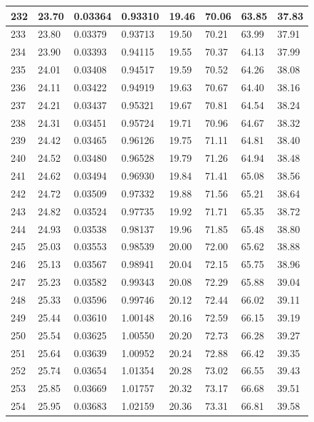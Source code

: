 \documentclass[12pt,a4paper,twoside]{article}
\begin{document}
\begin{center}
\begin{longtable}{l l l l | l l l l}
232 & 23.70 & 0.03364 & 0.93310 & 19.46 & 70.06 & 63.85 & 37.83 \\ \hline
233 & 23.80 & 0.03379 & 0.93713 & 19.50 & 70.21 & 63.99 & 37.91 \\ \hline
234 & 23.90 & 0.03393 & 0.94115 & 19.55 & 70.37 & 64.13 & 37.99 \\ \hline
235 & 24.01 & 0.03408 & 0.94517 & 19.59 & 70.52 & 64.26 & 38.08 \\ \hline
236 & 24.11 & 0.03422 & 0.94919 & 19.63 & 70.67 & 64.40 & 38.16 \\ \hline
237 & 24.21 & 0.03437 & 0.95321 & 19.67 & 70.81 & 64.54 & 38.24 \\ \hline
238 & 24.31 & 0.03451 & 0.95724 & 19.71 & 70.96 & 64.67 & 38.32 \\ \hline
239 & 24.42 & 0.03465 & 0.96126 & 19.75 & 71.11 & 64.81 & 38.40 \\ \hline
240 & 24.52 & 0.03480 & 0.96528 & 19.79 & 71.26 & 64.94 & 38.48 \\ \hline
241 & 24.62 & 0.03494 & 0.96930 & 19.84 & 71.41 & 65.08 & 38.56 \\ \hline
242 & 24.72 & 0.03509 & 0.97332 & 19.88 & 71.56 & 65.21 & 38.64 \\ \hline
243 & 24.82 & 0.03524 & 0.97735 & 19.92 & 71.71 & 65.35 & 38.72 \\ \hline
244 & 24.93 & 0.03538 & 0.98137 & 19.96 & 71.85 & 65.48 & 38.80 \\ \hline
245 & 25.03 & 0.03553 & 0.98539 & 20.00 & 72.00 & 65.62 & 38.88 \\ \hline
246 & 25.13 & 0.03567 & 0.98941 & 20.04 & 72.15 & 65.75 & 38.96 \\ \hline
247 & 25.23 & 0.03582 & 0.99343 & 20.08 & 72.29 & 65.88 & 39.04 \\ \hline
248 & 25.33 & 0.03596 & 0.99746 & 20.12 & 72.44 & 66.02 & 39.11 \\ \hline
249 & 25.44 & 0.03610 & 1.00148 & 20.16 & 72.59 & 66.15 & 39.19 \\ \hline
250 & 25.54 & 0.03625 & 1.00550 & 20.20 & 72.73 & 66.28 & 39.27 \\ \hline
251 & 25.64 & 0.03639 & 1.00952 & 20.24 & 72.88 & 66.42 & 39.35 \\ \hline
252 & 25.74 & 0.03654 & 1.01354 & 20.28 & 73.02 & 66.55 & 39.43 \\ \hline
253 & 25.85 & 0.03669 & 1.01757 & 20.32 & 73.17 & 66.68 & 39.51 \\ \hline
254 & 25.95 & 0.03683 & 1.02159 & 20.36 & 73.31 & 66.81 & 39.58 \\ \hline

\end{longtable}
\end{center}
\end{document}
